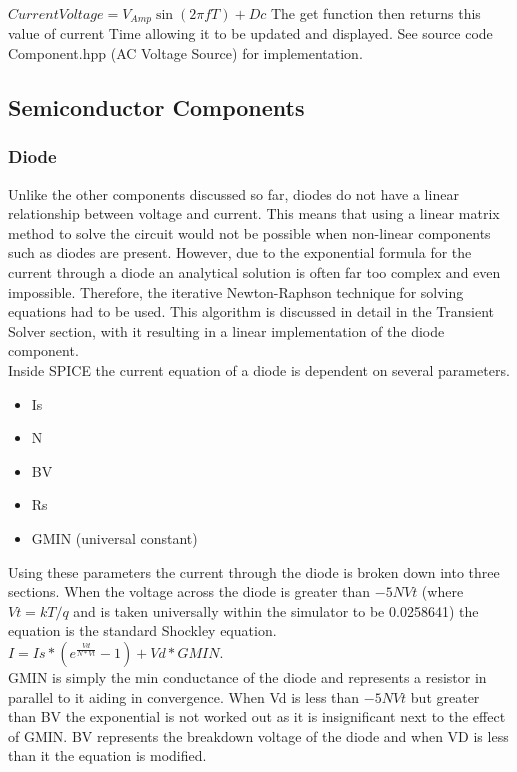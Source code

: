 \documentclass{article}
\begin{document}
$ CurrentVoltage = V_{Amp}  \sin{(2\pi f T)} + Dc $
\medbreak
The get function then returns this value of current Time allowing it to be updated and displayed.
\bigbreak
See source code Component.hpp (AC Voltage Source) for implementation.
\newpage

\subsection{Semiconductor Components}
\subsubsection{Diode}\label{ssec:Diode}
Unlike the other components discussed so far, diodes do not have a linear relationship between voltage and current. This means that using a linear matrix method to solve the circuit would not be possible when non-linear components such as diodes are present. However, due to the exponential formula for the current through a diode an analytical solution is often far too complex and even impossible. Therefore, the iterative Newton-Raphson technique for solving equations had to be used\cite{DiodeModel}. This algorithm is discussed in detail in the Transient Solver section, with it resulting in a linear implementation of the diode component.
\\
Inside SPICE the current equation of a diode is dependent on several parameters. 
\begin{itemize}
    \item Is
    \item N
    \item BV
    \item Rs
    \item GMIN (universal constant)
\end{itemize}
Using these parameters the current through the diode is broken down into three sections. When the voltage across the diode is greater than $-5NVt$ (where $Vt = kT/q$ and is taken universally within the simulator to be 0.0258641) the equation is the standard Shockley equation.\bigbreak \\ $I = Is*(e^{\frac{Vd}{N*Vt}}-1) + Vd*GMIN$. \\\bigbreak GMIN is simply the min conductance of the diode and represents a resistor in parallel to it aiding in convergence. When Vd is less than $-5NVt$ but greater than BV the exponential is not worked out as it is insignificant next to the effect of GMIN. BV represents the breakdown voltage of the diode and when VD is less than it the equation is modified.\bigbreak
\end{document}
